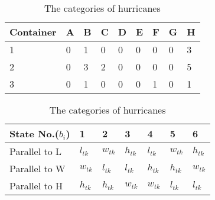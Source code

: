 \documentclass{mcmthesis}
\begin{document}
                 \begin{table}[!ht]
                    \caption{The categories of hurricanes}
                     \renewcommand\arraystretch{1.5}
                     \setlength{\abovecaptionskip}{0pt}%
                    \setlength{\belowcaptionskip}{10pt}%
                    \begin{center}
                    \begin{tabular}{p{}p{}m{}}
                    \toprule[1.5pt]
                     Container & A & B & C & D & E & F & G & H\\
                     \midrule
                    
                      1 & 0 & 1 & 0 & 0 & 0 & 0 & 0 & 3  \\
                    
                      2 & 0 & 3 & 2 & 0 & 0 & 0 & 0 & 5  \\
                    
                      3 & 0 & 1 & 0 & 0 & 0 & 1 & 0 & 1  \\
                    
                      \bottomrule[1.5pt]
                     \end{tabular}
                     \end{center} 
                     \end{table}

                     \begin{table}[!ht]
                        \caption{The categories of hurricanes}
                         \renewcommand\arraystretch{1.5}
                         \setlength{\abovecaptionskip}{0pt}%
                        \setlength{\belowcaptionskip}{10pt}%
                        \begin{center}
                        \begin{tabular}{p{}p{}m{}}
                        \toprule[1.5pt]
                         State No.($b_i$) & 1 & 2 & 3 & 4 & 5 & 6 \\
                         \midrule
                        
                          Parallel to L & $l_{tk}$ & $w_{tk}$ & $h_{tk}$ & $l_{tk}$ & $w_{tk}$ & $h_{tk}$   \\
                        
                          Parallel to W & $w_{tk}$ & $l_{tk}$ & $l_{tk}$ & $h_{tk}$ & $h_{tk}$ & $w_{tk}$   \\
                        
                          Parallel to H & $h_{tk}$ & $h_{tk}$ & $w_{tk}$ & $w_{tk}$ & $l_{tk}$ & $l_{tk}$ \\
                        
                          \bottomrule[1.5pt]
                         \end{tabular}
                         \end{center} 
                         \end{table}
\end{document}
